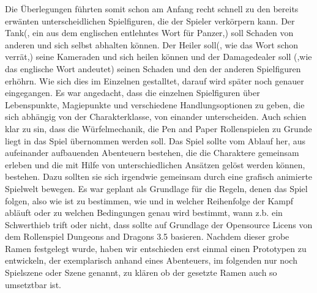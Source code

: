 Die Überlegungen führten somit schon am Anfang recht schnell zu den bereits erwänten unterscheidlichen Spielfiguren, die der Spieler verkörpern kann. Der Tank(, ein aus dem englischen entlehntes Wort für Panzer,) soll Schaden von anderen und sich selbst abhalten können. Der Heiler soll(, wie das Wort schon verrät,) seine Kameraden und sich heilen können und der Damagedealer soll (,wie das englische Wort andeutet) seinen Schaden und den der anderen Spielfiguren erhöhrn. Wie sich dies im Einzelnen gestalltet, darauf wird später noch genauer eingegangen. Es war angedacht, dass die einzelnen Spielfiguren über Lebenspunkte, Magiepunkte und verschiedene Handlungsoptionen zu geben, die sich abhängig von der Charakterklasse, von einander unterscheiden. 
Auch schien klar zu sin, dass die Würfelmechanik, die Pen and Paper Rollenspielen zu Grunde liegt in das Spiel übernommen werden soll.
Das Spiel sollte vom Ablauf her, aus aufeinander aufbauenden Abenteuern bestehen, die die Charaktere gemeinsam erleben und die mit Hilfe von unterschiedlichen Ansätzen gelöst werden können, bestehen. Dazu sollten sie sich irgendwie gemeinsam durch eine grafisch animierte Spielwelt bewegen.
Es war geplant als Grundlage für die Regeln, denen das Spiel folgen, also wie ist zu bestimmen, wie und in welcher Reihenfolge der Kampf abläuft oder zu welchen Bedingungen genau wird bestimmt, wann z.b. ein Schwerthieb trift oder nicht, dass sollte auf Grundlage der Opensource Licens von dem Rollenspiel Dungeons and Dragons 3.5 basieren.
Nachdem dieser grobe Ramen festgelegt wurde, haben wir entschieden erst einmal einen Prototypen zu entwickeln, der exemplarisch anhand eines Abenteuers, im folgenden nur noch Spielszene oder Szene genannt, zu klären ob der gesetzte Ramen auch so umsetztbar ist. 

